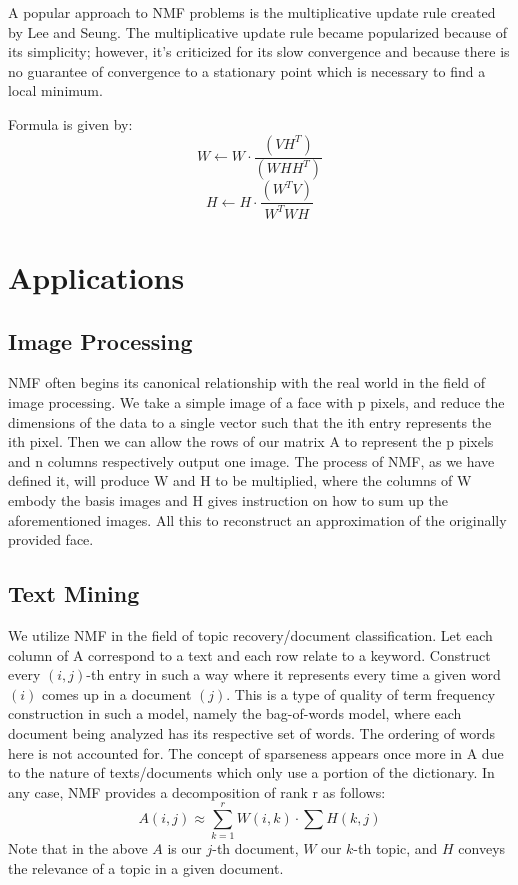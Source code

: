 \documentclass[
10pt, %
a4paper, %
oneside, %
headinclude,footinclude, %
BCOR5mm, %
]{scrartcl}
\begin{document}
A popular approach to NMF problems is the multiplicative update rule created by Lee and Seung.
The multiplicative update rule became popularized because of its simplicity;
however, it's criticized for its slow convergence and because there is no guarantee of convergence to a stationary point which is necessary to find a local minimum.

Formula is given by:
$$W\leftarrow W\cdot\frac{(VH^{T})}{(WHH^{T})}$$
$$H\leftarrow H\cdot\frac{(W^{T}V)}{W^{T}WH}$$


\section{Applications}

\lipsum[2]

\subsection{Image Processing}
NMF often begins its canonical relationship with the real world in the field of image processing. We take a simple image of a face with p pixels, and reduce the dimensions of the data to a single vector such that the ith entry represents the ith pixel. Then we can allow the rows of our matrix A to represent the p pixels and n columns respectively output one image. The process of NMF, as we have defined it, will produce W and H to be multiplied, where the columns of W embody the basis images and H gives instruction on how to sum up the aforementioned images. All this to reconstruct an approximation of the originally provided face.

\subsection{Text Mining}
We utilize NMF in the field of topic recovery/document classification.
Let each column of A correspond to a text and each row relate to a keyword.
Construct every $(i,j)$-th entry in such a way where it represents every time a given word $(i)$ comes up in a document $(j)$.
This is a type of quality of term frequency construction in such a model, namely the bag-of-words model, where each document being analyzed has its respective set of words.
The ordering of words here is not accounted for.
The concept of sparseness appears once more in A due to the nature of texts/documents which only use a portion of the dictionary.
In any case, NMF provides a decomposition of rank r as follows:
$$A(i,j)\approx\sum_{k=1}^{r}W(i,k)\cdot\sum H(k,j)$$
Note that in the above $A$ is our $j$-th document, $W$ our $k$-th topic, and $H$ conveys the relevance of a topic in a given document. 
\end{document}
